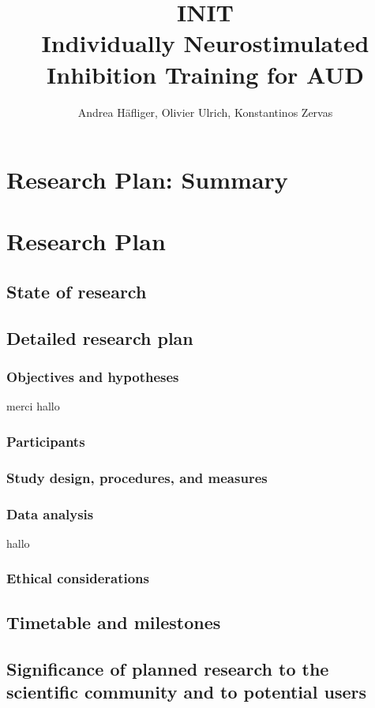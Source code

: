 \documentclass[12pt]{article}
\title{%
	INIT \\
	\large Individually Neurostimulated Inhibition Training for AUD}
\author{Andrea Häfliger, Olivier Ulrich, Konstantinos Zervas}
\begin{document}
\pagestyle{fancy}
\thispagestyle{empty}

\maketitle
\newpage
\tableofcontents
\newpage

\section{Research Plan: Summary}

\cite{jones_effects_2013}
\lipsum[1-5]

\section{Research Plan}

\lipsum

\subsection{State of research}

\lipsum[1-3]

\subsection{Detailed research plan}

\lipsum[1-5]

\subsubsection{Objectives and hypotheses}
merci hallo
\lipsum[1-2]

\subsubsection{Participants}

\lipsum[1-2]

\subsubsection{Study design, procedures, and measures}

\lipsum[1-3]

\subsubsection{Data analysis}
hallo
\lipsum[1-3]

\subsubsection{Ethical considerations}

\lipsum[1-2]

\subsection{Timetable and milestones}

\lipsum[1-2]

\subsection{Significance of planned research to the scientific community and to potential users}

\lipsum[1-2]

\printbibliography  
\end{document}
